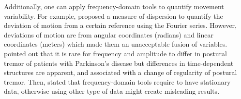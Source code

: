 %


Additionally, one can apply frequency-domain tools to quantify movement 
variability.
For example, \cite{hatze1986} proposed a measure of dispersion to 
quantify the deviation of motion from a certain reference using the 
Fourier series. However, deviations of motion are from angular coordinates 
(radians) and linear coordinates (meters) which made them an unacceptable 
fusion of variables. 
\cite{vaillancourt2001} pointed out that it is rare for frequency and 
amplitude to differ in postural tremor of patients with Parkinson's disease
but differences in time-dependent structures are apparent, and associated with 
a change of regularity of postural tremor.
Then, \citep{klonowski2002, klonowski2007, klonowski2009} stated that 
frequency-domain tools require to have stationary data, otherwise using 
other type of data might create misleading results.

%

